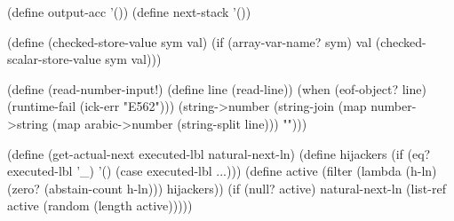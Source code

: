 \begin{CodeBlock}
(define output-acc '())
(define next-stack '())

(define (checked-store-value sym val)
  (if (array-var-name? sym)
      val
      (checked-scalar-store-value sym val)))

(define (read-number-input!)
  (define line (read-line))
  (when (eof-object? line)
    (runtime-fail (ick-err "E562")))
  (string->number
   (string-join
    (map number->string
         (map arabic->number
              (string-split line)))
    "")))

(define (get-actual-next executed-lbl natural-next-ln)
  (define hijackers
    (if (eq? executed-lbl '_)
        '()
        (case executed-lbl ...)))
  (define active
    (filter (lambda (h-ln)
              (zero? (abstain-count h-ln)))
            hijackers))
  (if (null? active)
      natural-next-ln
      (list-ref active (random (length active)))))
\end{CodeBlock}
